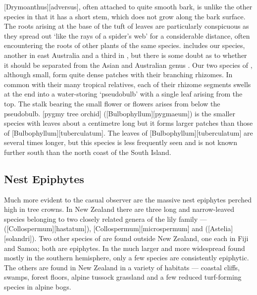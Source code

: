 [Drymoanthus][adversus], often attached to quite smooth bark, is unlike the other species in that it has a short stem, which does not grow along the bark surface.
The roots arising at the base of the tuft of leaves are particularly conspicuous as they spread out `like the rays of a spider's web' for a considerable distance, often encountering the roots of other plants of the same species.  includes our species, another in east Australia and a third in , but there is some doubt as to whether it should be separated from the Asian and Australian genus .
Our two species of , although small, form quite dense patches with their branching rhizomes.
In common with their many tropical relatives, each of their rhizome segments swells at the end into a water-storing `pseudobulb' with a single leaf arising from the top.
The stalk bearing the small flower or flowers arises from below the pseudobulb. [pygmy tree orchid] ([Bulbophyllum][pygmaeum]) is the smaller species with leaves about a centimetre long but it forms larger patches than those of [Bulbophyllum][tuberculatum].
The leaves of [Bulbophyllum][tuberculatum] are several times longer, but this species is less frequently seen and is not known further south than the north coast of the South Island.

\subsection{Nest Epiphytes}

Much more evident to the casual observer are the massive nest epiphytes perched high in tree crowns.
In New Zealand there are three long and narrow-leaved species belonging to two closely related genera of the lily family ---  ([Collospermum][hastatum]), [Collospermum][microspermum] and  ([Astelia][solandri]).
Two other species of  are found outside New Zealand, one each in Fiji and Samoa; both are epiphytes.
In the much larger and more widespread  found mostly in the southern hemisphere, only a few species are consistently epiphytic.
The others are found in New Zealand in a variety of habitats --- coastal cliffs, swamps, forest floors, alpine tussock grassland and a few reduced turf-forming species in alpine bogs.

